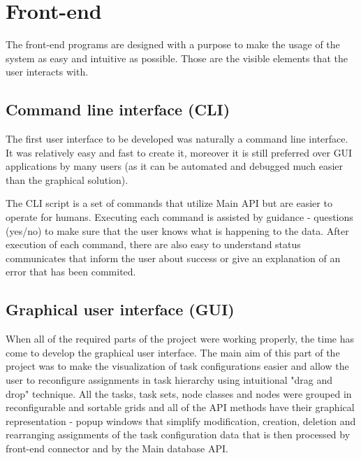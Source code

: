 \documentclass{customization}
\begin{document}

\newpage
\section{Front-end}
\hspace{0.6cm}

The front-end programs are designed with a purpose to make the usage of the system as easy and intuitive as possible. Those are the visible elements that the user interacts with.


\subsection{Command line interface (CLI)}
\hspace{0.6cm}

The first user interface to be developed was naturally a command line interface. It was relatively easy and fast to create it, moreover it is still preferred over GUI applications by many users (as it can be automated and debugged much easier than the graphical solution).
\newline

\noindent
The CLI script is a set of commands that utilize Main API but are easier to operate for humans. Executing each command is assisted by guidance - questions (yes/no) to make sure that the user knows what is happening to the data. After execution of each command, there are also easy to understand status communicates that inform the user about success or give an explanation of an error that has been commited.


\subsection{Graphical user interface (GUI)}
\hspace{0.6cm}

When all of the required parts of the project were working properly, the time has come to develop the graphical user interface. The main aim of this part of the project was to make the visualization of task configurations easier and allow the user to reconfigure assignments in task hierarchy using intuitional "drag and drop" technique. All the tasks, task sets, node classes and nodes were grouped in reconfigurable and sortable grids and all of the API methods have their graphical representation - popup windows that simplify modification, creation, deletion and rearranging assignments of the task configuration data that is then processed by front-end connector and by the Main database API.
\newline
\end{document}
